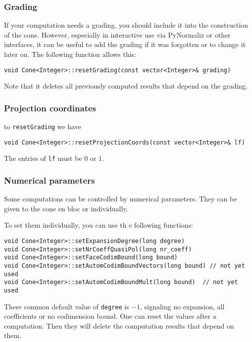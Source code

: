 \documentclass[12pt,a4paper]{scrartcl}
\theoremstyle{definition}
\begin{document}
\begin{small}
\subsubsection{Grading}

If your computation needs a grading, you should include it into the construction of the cone. However, especially in interactive use via PyNormaliz or other interfaces, it can be useful to add the grading if it was forgotten or to change it later on. The following function allows this:

\begin{Verbatim}
void Cone<Integer>::resetGrading(const vector<Integer>& grading)
\end{Verbatim}

Note that it deletes all previously computed results that depend on the grading.

\subsubsection{Projection coordinates}

to \verb|resetGrading| we have
\begin{Verbatim}
void Cone<Integer>::resetProjectionCoords(const vector<Integer>& lf)
\end{Verbatim}
The entries of \verb|lf| must be $0$ or $1$.

\subsubsection{Numerical parameters}

Some computations can be controlled by numerical parameters. They can be given to the cone en bloc or individually.

To set them individually, you can use th e following functions:
\begin{Verbatim}
void Cone<Integer>::setExpansionDegree(long degree)
void Cone<Integer>::setNrCoeffQuasiPol(long nr_coeff)
void Cone<Integer>::setFaceCodimBound(long bound)
void Cone<Integer>::setAutomCodimBoundVectors(long bound) // not yet used
void Cone<Integer>::setAutomCodimBoundMult(long bound)  // not yet used
\end{Verbatim}
There common default value of \verb|degree| is $-1$, signaling no expansion, all coefficients or no codimension bound. One can reset the values after a computation. Then they will delete the computation results that depend on them. 


\end{small}
\end{document}
